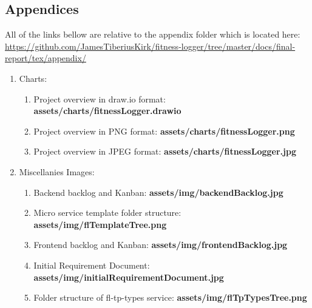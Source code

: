 \documentclass{article}
\newcommand{\vspaceconst}{-2ex}
\begin{document}
\begin{multicols}{2}

\newpage
\section*{Appendices}
\vspace{\vspaceconst}

All of the links bellow are relative to the appendix folder which is located here: \url{https://github.com/JamesTiberiusKirk/fitness-logger/tree/master/docs/final-report/tex/appendix/}
\begin{enumerate}
  \item Charts:
    \begin{enumerate}
      \item Project overview in draw.io format: \textbf{assets/charts/fitnessLogger.drawio}\\  
      \item Project overview in PNG format: \textbf{assets/charts/fitnessLogger.png}\\  
      \item Project overview in JPEG format: \textbf{assets/charts/fitnessLogger.jpg}\\
    \end{enumerate}
  \item Miscellanies Images:\\
    \begin{enumerate}
      \item Backend backlog and Kanban: \textbf{assets/img/backendBacklog.jpg}\\
      \item Micro service template folder structure: \textbf{assets/img/flTemplateTree.png}\\
      \item Frontend backlog and Kanban: \textbf{assets/img/frontendBacklog.jpg}\\
      \item Initial Requirement Document: \textbf{assets/img/initialRequirementDocument.jpg}\\
      \item Folder structure of fl-tp-types service: \textbf{assets/img/flTpTypesTree.png}\\
    \end{enumerate}

\end{enumerate}
\end{multicols}
\end{document}
